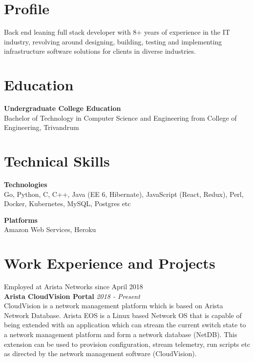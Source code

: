 \documentclass[line,margin]{res}
\begin{document}


\address{jojiantony@yandex.com}
\address{+91 96323 41954}

\begin{resume}

\section{Profile}
Back end leaning full stack developer with 8+ years of experience in the IT industry, revolving around designing, building, testing and implementing infrastructure software solutions for clients in diverse industries.

\section{Education}
{\bf Undergraduate College Education}\\
Bachelor of Technology in Computer Science and Engineering from College of Engineering, Trivandrum\\

\section{Technical Skills}

{\bf Technologies}\\
Go, Python, C, C++, Java (EE 6, Hibernate), JavaScript (React, Redux), Perl, Docker, Kubernetes, MySQL, Postgres etc

{\bf Platforms}\\
Amazon Web Services, Heroku

\section{Work Experience and Projects}

Employed at Arista Networks since April 2018\\

{\bf Arista CloudVision Portal} \hfill {\it{2018 - Present}}\\

CloudVision is a network management platform which is based on Arista Network Database. Arista EOS is a Linux based Network OS that is capable of being extended with an application which can stream the current switch state to a network management platform and form a network database (NetDB). This extension can be used to provision configuration, stream telemetry, run scripts etc as directed by the network management software (CloudVision). 


\end{resume}
\end{document}
